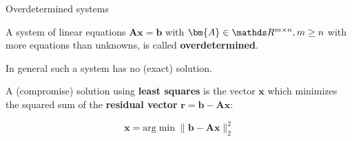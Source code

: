 



\newcommand{\xdownarrow}[1]{%
  {\left\downarrow\vbox to #1{}\right.\kern-\nulldelimiterspace}
}

\newcommand{\grey}[1]{\textcolor{grey}{#1}}
\newcommand{\red}[1]{\textcolor{red}{#1}}










\begin{vbframe}{Overdetermined systems}

A system of linear equations $\bm{Ax} = \bm{b}$ with $\bm{A} \in \R^{m\times n}, m \ge n$ with more equations than unknowns, is called \textbf{overdetermined}.

\lz

In general such a system has no (exact) solution.

\lz

A (compromise) solution using \textbf{least squares} is the vector $\bm{x}$ which minimizes the squared sum of the \textbf{residual vector} $\bm{r} = \mathbf{b} - \mathbf{A}\boldsymbol{x}$:

$$
\bm{x} = \text{arg} \min \|\mathbf{b} - \mathbf{A}\boldsymbol{x}\|^2_2
$$

\end{vbframe}

